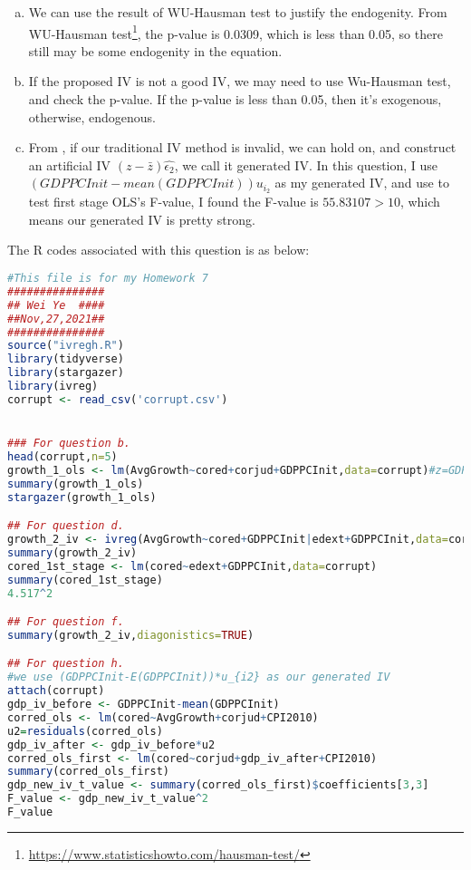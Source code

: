 \documentclass[11pt]{article} %
\begin{document}
\begin{enumerate}[a. ]
    \item We can use the result of WU-Hausman test to justify the endogenity. From WU-Hausman test\footnote{\url{https://www.statisticshowto.com/hausman-test/}}, the p-value is 0.0309, which is less than 0.05, so there still may be some endogenity in the equation.
    \item If the proposed IV is not a good IV, we may need to use Wu-Hausman test, and check the p-value. If the p-value is less than 0.05, then it's exogenous, otherwise, endogenous.
    \item From \citet{lewbel2012using}, if our traditional IV method is invalid, we can hold on, and construct an artificial IV $(z-\bar{z})\hat{\epsilon_2}$, we call it generated IV. 
            In this question, I use $(GDPPCInit-mean(GDPPCInit))u_{i_2}$
            as my generated IV, and use \citet{staiger1994instrumental} to test first stage OLS's F-value, I found the F-value is  $55.83107>10$, which means our generated IV is pretty strong.   
\end{enumerate}
The R codes associated with this question is as below:
\begin{lstlisting}[language=R]
    #This file is for my Homework 7
###############
## Wei Ye  ####
##Nov,27,2021##
###############
source("ivregh.R")
library(tidyverse)
library(stargazer)
library(ivreg)
corrupt <- read_csv('corrupt.csv')


### For question b.
head(corrupt,n=5)
growth_1_ols <- lm(AvgGrowth~cored+corjud+GDPPCInit,data=corrupt)#z=GDPPCInit
summary(growth_1_ols)
stargazer(growth_1_ols)

## For question d.
growth_2_iv <- ivreg(AvgGrowth~cored+GDPPCInit|edext+GDPPCInit,data=corrupt)
summary(growth_2_iv)
cored_1st_stage <- lm(cored~edext+GDPPCInit,data=corrupt)
summary(cored_1st_stage)
4.517^2

## For question f.
summary(growth_2_iv,diagonistics=TRUE)

## For question h.
#we use (GDPPCInit-E(GDPPCInit))*u_{i2} as our generated IV
attach(corrupt)
gdp_iv_before <- GDPPCInit-mean(GDPPCInit)
corred_ols <- lm(cored~AvgGrowth+corjud+CPI2010)
u2=residuals(corred_ols)
gdp_iv_after <- gdp_iv_before*u2
corred_ols_first <- lm(cored~corjud+gdp_iv_after+CPI2010)
summary(corred_ols_first)
gdp_new_iv_t_value <- summary(corred_ols_first)$coefficients[3,3]
F_value <- gdp_new_iv_t_value^2
F_value
\end{lstlisting}
\end{document}
